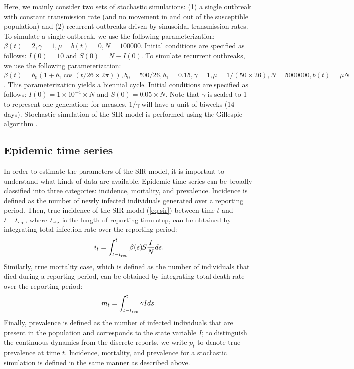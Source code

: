 \documentclass{article}
\newcommand{\eref}[1]{(\ref{eq:#1})}
\newcommand{\tsub}[2]{#1_{{\textrm{\tiny #2}}}}
\begin{document}
Here, we mainly consider two sets of stochastic simulations: (1) a single outbreak with constant transmission rate (and no movement in and out of the susceptible population) and (2) recurrent outbreaks driven by sinusoidal transmission rates.
To simulate a single outbreak, we use the following parameterization: $\beta(t) = 2, \gamma=1, \mu=b(t) = 0, N=100000$.
Initial conditions are specified as follows: $I(0) = 10$ and $S(0) = N - I(0)$.
To simulate recurrent outbreaks, we use the following parameterization: $\beta(t) = b_0 (1 + b_1 \cos (t/26 \times 2\pi)), b_0 = 500/26, b_1 = 0.15, \gamma = 1, \mu=1/(50 \times 26), N=5000000, b(t) = \mu N$. 
This parameterization yields a biennial cycle.
Initial conditions are specified as follows: $I(0) = 1 \times 10^{-4} \times N$ and $S(0) = 0.05 \times N$.
Note that $\gamma$ is scaled to 1 to represent one generation; for measles, $1/\gamma$ will have a unit of biweeks (14 days).
Stochastic simulation of the SIR model is performed using the Gillespie algorithm \citep{gillespie1976general}.

\subsection{Epidemic time series}

In order to estimate the parameters of the SIR model, it is important to understand what kinds of data are available.
Epidemic time series can be broadly classified into three categories: incidence, mortality, and prevalence.
Incidence is defined as the number of newly infected individuals generated over a reporting period.
Then, true incidence of the SIR model \eref{sir} between time $t$ and $t-\tsub{t}{rep}$, where $\tsub{t}{rep}$ is the length of reporting time step, can be obtained by integrating total infection rate over the reporting period:
\begin{equation}
i_t = \int_{t-\tsub{t}{rep}}^{t} \beta(s) S \frac{I}{N} ds.
\end{equation}
Similarly, true mortality case, which is defined as the number of individuals that died during a reporting period, can be obtained by integrating total death rate  over the reporting period:
\begin{equation}
m_t = \int_{t-\tsub{t}{rep}}^{t} \gamma I ds.
\end{equation}
Finally, prevalence is defined as the number of infected individuals that are present in the population and corresponds to the state variable $I$; to distinguish the continuous dynamics from the discrete reports, we write $p_t$ to denote true prevalence at time $t$.
Incidence, mortality, and prevalence for a stochastic simulation is defined in the same manner as described above.
\end{document}
